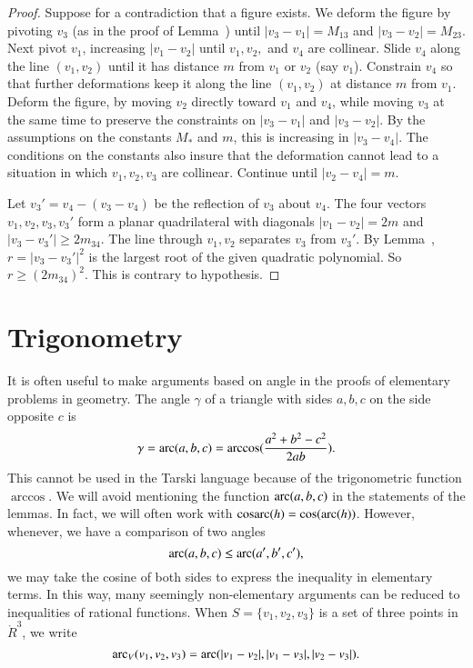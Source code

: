 \begin{tarskidata}
\begin{tarski}

\begin{proof}  Suppose for a contradiction that a figure exists.
We deform the figure by pivoting $v_3$ 
(as in the proof of Lemma~)
until $|v_3-v_1| = M_{13}$ and $|v_3-v_2|=M_{23}$.   Next pivot $v_1$, increasing $|v_1-v_2|$
until $v_1,v_2,$ and $v_4$ are collinear.  Slide $v_4$ along the line $(v_1,v_2)$ until
it has distance $m$ from $v_1$ or $v_2$ (say $v_1$).   Constrain $v_4$ so that further
deformations keep it along the line $(v_1,v_2)$ at distance $m$ from $v_1$.  
Deform the figure, by moving $v_2$ directly toward $v_1$ and $v_4$, while moving
$v_3$ at the same time to preserve the constraints on $|v_3-v_1|$ and $|v_3-v_2|$.  By
the assumptions on the constants $M_*$ and $m$, this is increasing in $|v_3-v_4|$.  The conditions
on the constants also insure that the deformation cannot lead to a situation in which
$v_1,v_2,v_3$ are collinear.  Continue
until $|v_2-v_4|=m$.

Let $v_3' = v_4 - (v_3-v_4)$ be the reflection of $v_3$ about $v_4$.  The four vectors
$v_1,v_2,v_3,v_3'$ form a planar quadrilateral with diagonals $|v_1-v_2|=2m$ and $|v_3-v_3'| \ge 2m_{34}$.
The line through $v_1,v_2$ separates $v_3$ from $v_3'$.  By Lemma~,  
$r = |v_3-v_3'|^2$ is
the largest root of the given quadratic polynomial.  So $r \ge (2 m_{34})^2$.  This is contrary
to hypothesis.
\end{proof}
\end{tarski}






\section{Trigonometry}


It is often useful to make arguments based on angle in the proofs
of elementary problems in geometry. The angle $\gamma$
of a triangle with sides
$a,b,c$ on the side opposite $c$ is
    $$
    \gamma = \operatorname{arc}(a,b,c)=\arccos(\frac{a^2 + b^2 - c^2}{2 a b}).
    $$
This cannot be used in the Tarski language because of the trigonometric
function $\arccos$.  We will avoid mentioning the function
$\operatorname{arc}(a,b,c)$ in the statements of the lemmas.
In fact, we will often work with $\operatorname{cosarc}(h) = \cos(\operatorname{arc}(h))$.
However, whenever, we have a comparison of
two angles
    $$
    \operatorname{arc}(a,b,c) \le \operatorname{arc}(a',b',c'),
    $$
we may take the cosine of both sides to express the inequality in
elementary terms.  In this way, many seemingly non-elementary arguments
can be reduced to inequalities of rational functions.  When
$S=\{v_1,v_2,v_3\}$ is a set of three points in $\ring{R}^3$, we write
   $$
   \operatorname{arc}_V(v_1,v_2,v_3) = \operatorname{arc}(|v_1-v_2|,|v_1-v_3|,|v_2-v_3|).
   $$


\end{tarskidata}
